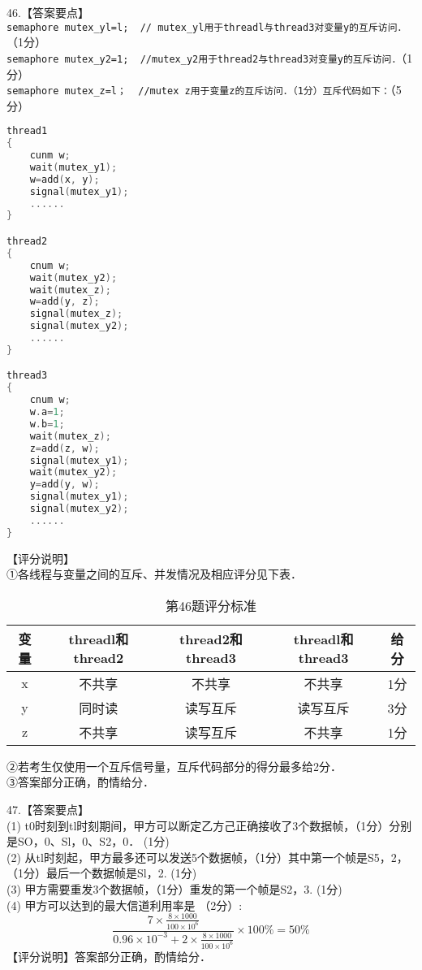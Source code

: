 46.【答案要点】 \\
\verb|semaphore mutex_yl=l;  // mutex_yl用于threadl与thread3对变量y的互斥访问．|（1分） \\
\verb|semaphore mutex_y2=1;  //mutex_y2用于thread2与thread3对变量y的互斥访问．|（1分） \\
\verb|semaphore mutex_z=l；  //mutex z用于变量z的互斥访问．（1分）互斥代码如下：|（5分） \\
\begin{lstlisting}[language=cpp]
thread1
{
    cunm w;
    wait(mutex_y1);
    w=add(x, y);
    signal(mutex_y1);
    ......
}

thread2
{
    cnum w;
    wait(mutex_y2);
    wait(mutex_z);
    w=add(y, z);
    signal(mutex_z);
    signal(mutex_y2);
    ......
}

thread3
{
    cnum w;
    w.a=1;
    w.b=1;
    wait(mutex_z);
    z=add(z, w);
    signal(mutex_y1);
    wait(mutex_y2);
    y=add(y, w);
    signal(mutex_y1);
    signal(mutex_y2);
    ......
}
\end{lstlisting}
【评分说明】 \\
①各线程与变量之间的互斥、并发情况及相应评分见下表．
\begin{table}[ht]
\centering
\caption{第46题评分标准}\label{CSN17_tab4}
\begin{tabular}{|c|c|c|c|c|}
\hline
变量 & threadl和thread2 & thread2和thread3 & threadl和thread3 & 给分 \\
\hline
x & 不共享 & 不共享 & 不共享 & 1分 \\
\hline
y & 同时读 & 读写互斥 & 读写互斥 & 3分 \\
\hline
z & 不共享 & 读写互斥 & 不共享 & 1分 \\
\hline
\end{tabular}
\end{table}
②若考生仅使用一个互斥信号量，互斥代码部分的得分最多给2分． \\
③答案部分正确，酌情给分．

47.【答案要点】 \\
(1) t0时刻到tl时刻期间，甲方可以断定乙方己正确接收了3个数据帧，（1分）分别是SO，0、Sl，0、S2，0． (1分) \\
(2) 从tl时刻起，甲方最多还可以发送5个数据帧，（1分）其中第一个帧是S5，2，（1分）最后一个数据帧是Sl，2. (1分) \\
(3) 甲方需要重发3个数据帧，（1分）重发的第一个帧是S2，3. (1分) \\
(4) 甲方可以达到的最大信道利用率是 （2分）: \\
\begin{equation}
\frac{7 \times \frac{8\times1000}{100\times10^6}}{0.96\times10^{-3}+2\times\frac{8\times1000}{100\times10^6}}\times100\%=50\%
\end{equation}
【评分说明】答案部分正确，酌情给分．